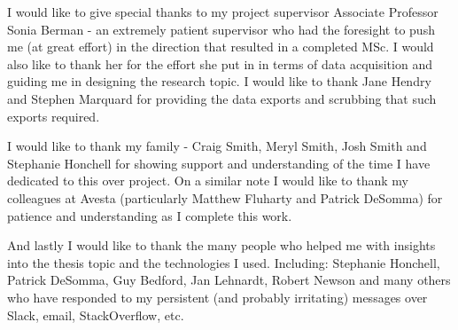 I would like to give special thanks to my project supervisor Associate Professor Sonia Berman - an extremely patient supervisor who had the foresight to push me (at great effort) in the direction that resulted in a completed MSc. I would also like to thank her for the effort she put in in terms of data acquisition and guiding me in designing the research topic. I would like to thank Jane Hendry and Stephen Marquard for providing the data exports and scrubbing that such exports required.

I would like to thank my family - Craig Smith, Meryl Smith, Josh Smith and Stephanie Honchell for showing support and understanding of the time I have dedicated to this over project. On a similar note I would like to thank my colleagues at Avesta (particularly Matthew Fluharty and Patrick DeSomma) for patience and understanding as I complete this work.

And lastly I would like to thank the many people who helped me with insights into the thesis topic and the technologies I used. Including: Stephanie Honchell, Patrick DeSomma, Guy Bedford, Jan Lehnardt, Robert Newson and many others who have responded to my persistent (and probably irritating) messages over Slack, email, StackOverflow, etc.